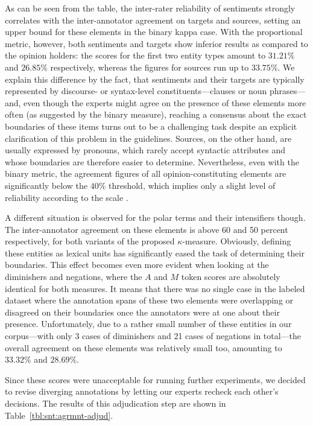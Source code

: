 As can be seen from the table, the inter-rater reliability of
sentiments strongly correlates with the inter-annotator agreement on
targets and sources, setting an upper bound for these elements in the
binary kappa case.  With the proportional metric, however, both
sentiments and targets show inferior results as compared to the
opinion holders: the scores for the first two entity types amount to
$31.21\%$ and $26.85\%$ respectively, whereas the figures for sources
run up to $33.75\%$.  We explain this difference by the fact, that
sentiments and their targets are typically represented by discourse-
or syntax-level constituents---clauses or noun phrases---and, even
though the experts might agree on the presence of these elements more
often (as suggested by the binary measure), reaching a consensus about
the exact boundaries of these items turns out to be a challenging task
despite an explicit clarification of this problem in the guidelines.
Sources, on the other hand, are usually expressed by pronouns, which
rarely accept syntactic attributes and whose boundaries are therefore
easier to determine.  Nevertheless, even with the binary metric, the
agreement figures of all opinion-constituting elements are
significantly below the $40\%$ threshold, which implies only a slight
level of reliability according to the \citeauthor{Landis:77} scale
\cite{Landis:77}.

A different situation is observed for the polar terms and
their intensifiers though.  The inter-annotator agreement on these
elements is above 60 and 50 percent respectively, for both variants of
the proposed $\kappa$-measure.  Obviously, defining these entities as
lexical units has significantly eased the task of determining their
boundaries.  This effect becomes even more evident when looking at the
diminishers and negations, where the $A$ and $M$ token scores are
absolutely identical for both measures.  It means that there was no
single case in the labeled dataset where the annotation spans of these
two elements were overlapping or disagreed on their boundaries once
the annotators were at one about their presence.  Unfortunately, due
to a rather small number of these entities in our corpus---with only
3 cases of diminishers and 21 cases of negations in total---the
overall agreement on these elements was relatively small too,
amounting to $33.32\%$ and $28.69\%$.

Since these scores were unacceptable for running further experiments,
we decided to revise diverging annotations by letting our experts
recheck each other's decisions.
The results of this adjudication step are shown in
Table~\ref{tbl:snt:agrmnt-adjud}.

